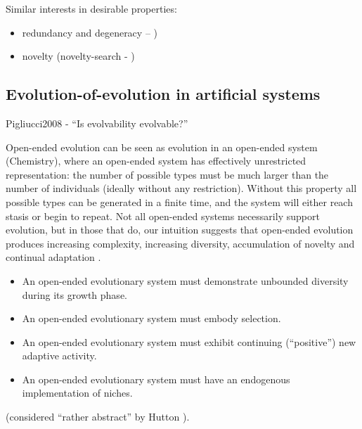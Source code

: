 Similar interests in desirable properties:

\begin{itemize}
	\item redundancy and degeneracy -- \autocite{Whitacre:2010qy})
	\item novelty (novelty-search - \autocite{Lehman:2008cr})
\end{itemize}


\subsection{Evolution-of-evolution in artificial systems}

Pigliucci2008 - ``Is evolvability evolvable?''

Open-ended evolution can be seen as evolution in an open-ended system (\eg Chemistry), where an open-ended system has effectively unrestricted representation: the number of possible types must be much larger than the number of individuals (ideally without any restriction). Without this property all possible types can be generated in a finite time, and the system will either reach stasis or begin to repeat. Not all open-ended systems necessarily support evolution, but in those that do, our intuition suggests that open-ended evolution produces increasing complexity, increasing diversity, accumulation of novelty and continual adaptation \cite{Lehman2012}.


\begin{itemize}
	\item An open-ended evolutionary system must demonstrate unbounded diversity during its growth phase.
	\item An open-ended evolutionary system must embody selection.
	\item An open-ended evolutionary system must exhibit continuing (``positive'') new adaptive activity.
	\item An open-ended evolutionary system must have an endogenous implementation of niches.
\end{itemize} \cite{Maley1999} (considered ``rather abstract'' by Hutton \parencite[p.341]{Hutton2002}).

